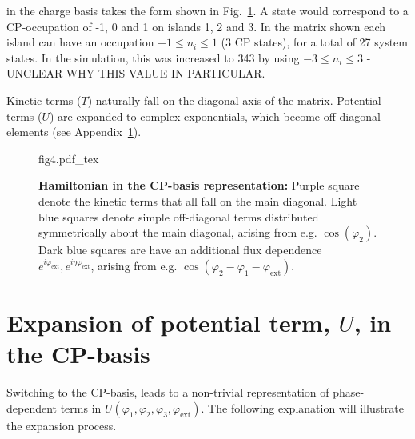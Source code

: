 \noindent in the charge basis  takes the  form  shown in  Fig.~\ref{fig:matrix_representation}.
A state  would correspond to a CP-occupation of -1, 0 and 1 on islands 1, 2 and 3.  In the  matrix shown each island  can have an
occupation $ -1 \le n_{i} \le 1$ (3 CP states), for a total of 27 system states.
{\color{red} In the simulation,  this was increased to 343  by using $ -3 \le n_{i}  \le 3 $ - UNCLEAR WHY THIS VALUE IN PARTICULAR}.

Kinetic terms  ($ {T}  $) naturally  fall on  the diagonal  axis of  the matrix.
Potential terms ($  U $) are expanded to complex  exponentials, which become off
diagonal elements (see Appendix~\ref{sec:expans-potent-term}).

\begin{figure}[h]
  \centering\def\svgwidth{8cm}{fig4.pdf_tex}
  \caption{\small \textbf{Hamiltonian in the CP-basis representation:} Purple square denote the kinetic terms that all fall on the main diagonal. Light blue squares denote simple off-diagonal terms distributed symmetrically about the main diagonal, arising from e.g. $\cos(\varphi_2)$. Dark blue squares are have an additional flux dependence $e^{i\varphi_{\text{ext}}}, e^{i\eta\varphi_{\text{ext}}}$, arising from e.g. $\cos(\varphi_2-\varphi_1-\varphi_{\text{ext}})$.
    \label{fig:matrix_representation} }
\end{figure}


\section{Expansion of potential term, $U$, in the CP-basis}
\label{sec:expans-potent-term}

\noindent Switching to the CP-basis, leads  to a non-trivial representation of phase-dependent
terms in  $ U(\varphi_1,\varphi_2,\varphi_3,\varphi_{\text{ext}})  $.  The following  explanation will  illustrate the
expansion process.

